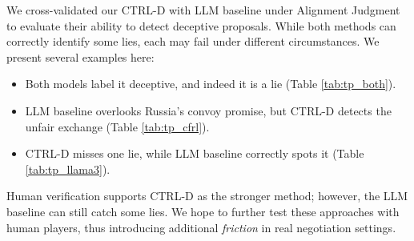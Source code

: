 We cross-validated our CTRL-D with LLM baseline under Alignment Judgment to evaluate their ability to detect deceptive proposals. While both methods can correctly identify some lies, each may fail under different circumstances. We present several examples here:

\begin{itemize}
    \item Both models label it deceptive, and indeed it is a lie (Table \ref{tab:tp_both}).
    \item LLM baseline overlooks Russia's convoy promise, but CTRL-D detects the unfair exchange (Table \ref{tab:tp_cfrl}).
    \item   CTRL-D misses one lie, while LLM baseline correctly spots it (Table \ref{tab:tp_llama3}). 
\end{itemize}

\begin{comment} UNCOMMENT TO REVERT

\end{comment}


Human verification supports CTRL-D as the stronger method; however, the LLM baseline can still catch some lies. We hope to further test these approaches with human players, thus introducing additional \textit{friction} in real negotiation settings.